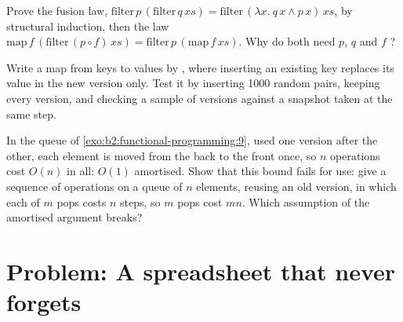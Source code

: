 \begin{exercise}[$\star\star\star$]\label{exo:b2:functional-programming:10}
Prove the  fusion law, $\mathrm{filter}\,p\,(\mathrm{filter}\,q\,xs) = \mathrm{filter}\,(\lambda x.\ q\,x \wedge
p\,x)\,xs$, by structural induction, then the law $\mathrm{map}\,f\,(\mathrm{filter}\,(p \circ f)\,xs) =
\mathrm{filter}\,p\,(\mathrm{map}\,f\,xs)$. Why do both need $p$, $q$ and $f$ ?
\end{exercise}

\begin{exercise}[$\star\star\star$]\label{exo:b2:functional-programming:11}
Write a  map from  keys to values by , where inserting an existing key replaces its
value in the new version only. Test it by inserting 1000 random pairs, keeping every version, and checking a sample of
versions against a  snapshot taken at the same step.
\end{exercise}

\begin{exercise}[$\star\star\star$]\label{exo:b2:functional-programming:12}
In the queue of \cref{exo:b2:functional-programming:9}, used one version after the other, each element is moved
from the back to the front once, so $n$ operations cost $O(n)$ in all: $O(1)$ amortised. Show that this bound fails
for  use: give a sequence of operations on a queue of $n$ elements, reusing an old version, in which each of
$m$ pops costs $n$ steps, so $m$ pops cost $mn$. Which assumption of the amortised argument breaks?
\end{exercise}

\section{Problem: A spreadsheet that never forgets}\label{sec:b2:functional-programming:problem}


